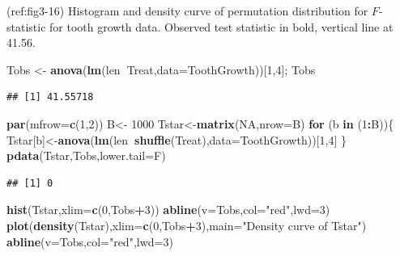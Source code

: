 \documentclass[]{book}
\newenvironment{Shaded}{\begin{snugshade}}{\end{snugshade}}
\newcommand{\KeywordTok}[1]{\textcolor[rgb]{0.13,0.29,0.53}{\textbf{#1}}}
\newcommand{\DataTypeTok}[1]{\textcolor[rgb]{0.13,0.29,0.53}{#1}}
\newcommand{\DecValTok}[1]{\textcolor[rgb]{0.00,0.00,0.81}{#1}}
\newcommand{\StringTok}[1]{\textcolor[rgb]{0.31,0.60,0.02}{#1}}
\newcommand{\OtherTok}[1]{\textcolor[rgb]{0.56,0.35,0.01}{#1}}
\newcommand{\ControlFlowTok}[1]{\textcolor[rgb]{0.13,0.29,0.53}{\textbf{#1}}}
\newcommand{\OperatorTok}[1]{\textcolor[rgb]{0.81,0.36,0.00}{\textbf{#1}}}
\newcommand{\NormalTok}[1]{#1}
\theoremstyle{definition}
\theoremstyle{definition}
\theoremstyle{remark}
\begin{document}
\begin{enumerate}
  (ref:fig3-16) Histogram and density curve of permutation distribution
  for \(F\)-statistic for tooth growth data. Observed test statistic in
  bold, vertical line at 41.56.

\begin{Shaded}
\begin{Highlighting}[]
\NormalTok{Tobs <-}\StringTok{ }\KeywordTok{anova}\NormalTok{(}\KeywordTok{lm}\NormalTok{(len}\OperatorTok{~}\NormalTok{Treat,}\DataTypeTok{data=}\NormalTok{ToothGrowth))[}\DecValTok{1}\NormalTok{,}\DecValTok{4}\NormalTok{]; Tobs}
\end{Highlighting}
\end{Shaded}

\begin{verbatim}
## [1] 41.55718
\end{verbatim}

\begin{Shaded}
\begin{Highlighting}[]
\KeywordTok{par}\NormalTok{(}\DataTypeTok{mfrow=}\KeywordTok{c}\NormalTok{(}\DecValTok{1}\NormalTok{,}\DecValTok{2}\NormalTok{))}
\NormalTok{B<-}\StringTok{ }\DecValTok{1000}
\NormalTok{Tstar<-}\KeywordTok{matrix}\NormalTok{(}\OtherTok{NA}\NormalTok{,}\DataTypeTok{nrow=}\NormalTok{B)}
\ControlFlowTok{for}\NormalTok{ (b }\ControlFlowTok{in}\NormalTok{ (}\DecValTok{1}\OperatorTok{:}\NormalTok{B))\{}
\NormalTok{  Tstar[b]<-}\KeywordTok{anova}\NormalTok{(}\KeywordTok{lm}\NormalTok{(len}\OperatorTok{~}\KeywordTok{shuffle}\NormalTok{(Treat),}\DataTypeTok{data=}\NormalTok{ToothGrowth))[}\DecValTok{1}\NormalTok{,}\DecValTok{4}\NormalTok{]}
\NormalTok{\}}
\KeywordTok{pdata}\NormalTok{(Tstar,Tobs,}\DataTypeTok{lower.tail=}\NormalTok{F)}
\end{Highlighting}
\end{Shaded}

\begin{verbatim}
## [1] 0
\end{verbatim}

\begin{Shaded}
\begin{Highlighting}[]
\KeywordTok{hist}\NormalTok{(Tstar,}\DataTypeTok{xlim=}\KeywordTok{c}\NormalTok{(}\DecValTok{0}\NormalTok{,Tobs}\OperatorTok{+}\DecValTok{3}\NormalTok{))}
\KeywordTok{abline}\NormalTok{(}\DataTypeTok{v=}\NormalTok{Tobs,}\DataTypeTok{col=}\StringTok{"red"}\NormalTok{,}\DataTypeTok{lwd=}\DecValTok{3}\NormalTok{)}
\KeywordTok{plot}\NormalTok{(}\KeywordTok{density}\NormalTok{(Tstar),}\DataTypeTok{xlim=}\KeywordTok{c}\NormalTok{(}\DecValTok{0}\NormalTok{,Tobs}\OperatorTok{+}\DecValTok{3}\NormalTok{),}\DataTypeTok{main=}\StringTok{"Density curve of Tstar"}\NormalTok{)}
\KeywordTok{abline}\NormalTok{(}\DataTypeTok{v=}\NormalTok{Tobs,}\DataTypeTok{col=}\StringTok{"red"}\NormalTok{,}\DataTypeTok{lwd=}\DecValTok{3}\NormalTok{)}
\end{Highlighting}
\end{Shaded}


\end{enumerate}
\end{document}
